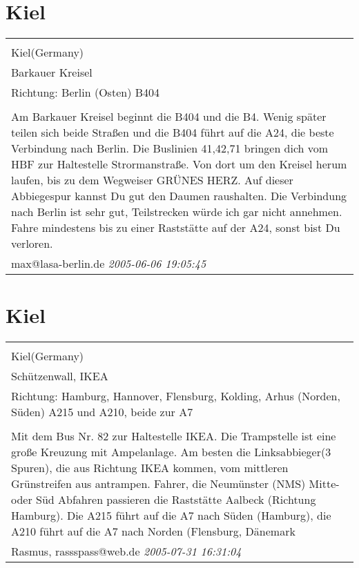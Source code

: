\documentclass[a4paper,12pt]{article}
\begin{document}
\section{Kiel}
\begin{tabular}{|p{13cm}|}
\hline\\
Kiel(Germany)\\
Barkauer Kreisel\\
Richtung: Berlin (Osten) B404 \\
\hline\\
Am Barkauer Kreisel beginnt die B404 und die B4. Wenig später teilen sich beide Straßen und die B404 führt auf die A24, die beste Verbindung nach Berlin. Die Buslinien 41,42,71 bringen dich vom HBF zur Haltestelle Strormanstraße. Von dort um den Kreisel herum laufen, bis zu dem Wegweiser GRÜNES HERZ. Auf dieser Abbiegespur kannst Du gut den Daumen raushalten. Die Verbindung nach Berlin ist sehr gut, Teilstrecken würde ich gar nicht annehmen. Fahre mindestens bis zu einer Raststätte auf der A24, sonst bist Du verloren. \\
max@lasa-berlin.de \textit{ 2005-06-06 19:05:45 }\\\hline
\end{tabular}


\section{Kiel}
\begin{tabular}{|p{13cm}|}
\hline\\
Kiel(Germany)\\
Schützenwall, IKEA\\
Richtung: Hamburg, Hannover, Flensburg, Kolding, Arhus (Norden, Süden) A215 und A210, beide zur A7 \\
\hline\\
Mit dem Bus Nr. 82 zur Haltestelle IKEA. Die Trampstelle ist eine große Kreuzung mit Ampelanlage. Am besten die Linksabbieger(3 Spuren), die aus Richtung IKEA kommen, vom mittleren Grünstreifen aus antrampen. Fahrer, die Neumünster (NMS) Mitte-oder Süd Abfahren passieren die Raststätte Aalbeck (Richtung Hamburg). Die A215 führt auf die A7 nach Süden (Hamburg), die A210 führt auf die A7 nach Norden (Flensburg, Dänemark \\
Rasmus, rassspass@web.de \textit{ 2005-07-31 16:31:04 }\\\hline
\end{tabular}
\end{document}
